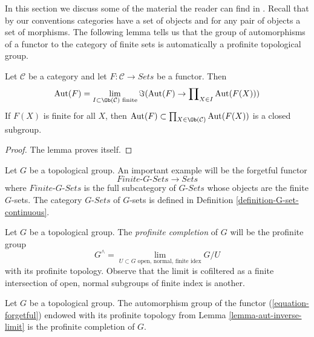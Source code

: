 \noindent
In this section we discuss some of the material the reader can
find in \cite[Expos\'e V, Sections 4, 5, and 6]{SGA1}.
Recall that by our conventions categories have a set of objects and
for any pair of objects a set of morphisms. The following lemma tells
us that the group of automorphisms of a functor to the category
of finite sets is automatically a profinite topological group.

\begin{lemma}
\label{lemma-aut-inverse-limit}
Let $\mathcal{C}$ be a category and let $F : \mathcal{C} \to \textit{Sets}$
be a functor. Then
$$
\text{Aut}(F) = \lim_{I \subset \Ob(\mathcal{C})\text{ finite}}
\Im(\text{Aut}(F) \to \prod\nolimits_{X \in I} \text{Aut}(F(X)))
$$
If $F(X)$ is finite for all $X$, then
$\text{Aut}(F) \subset \prod_{X \in \Ob(\mathcal{C})} \text{Aut}(F(X))$
is a closed subgroup.
\end{lemma}

\begin{proof}
The lemma proves itself.
\end{proof}

\begin{example}
\label{example-galois-category-G-sets}
Let $G$ be a topological group. An important example will be the
forgetful functor
\begin{equation}
\label{equation-forgetful}
\textit{Finite-}G\textit{-Sets} \longrightarrow \textit{Sets}
\end{equation}
where $\textit{Finite-}G\textit{-Sets}$ is the full subcategory of
$G\textit{-Sets}$ whose objects are the finite $G$-sets.
The category $G\textit{-Sets}$ of $G$-sets is defined in
Definition \ref{definition-G-set-continuous}.
\end{example}

\noindent
Let $G$ be a topological group. The {\it profinite completion} of $G$
will be the profinite group
$$
G^\wedge =
\lim_{U \subset G\text{ open, normal, finite idex}} G/U
$$
with its profinite topology. Observe that the limit is cofiltered
as a finite intersection of open, normal subgroups of finite index
is another.

\begin{lemma}
\label{lemma-single-out-profinite}
Let $G$ be a topological group. The automorphism group of the functor
(\ref{equation-forgetful}) endowed with its profinite topology from
Lemma \ref{lemma-aut-inverse-limit} is the profinite completion of $G$.
\end{lemma}

